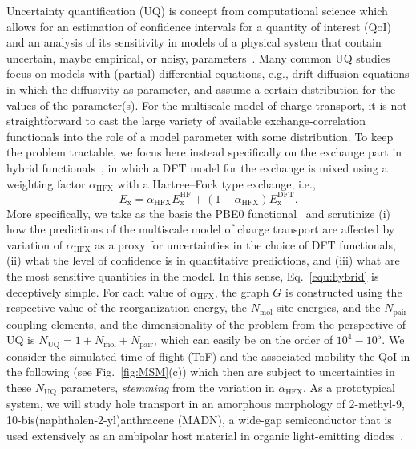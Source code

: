 \documentclass[%
 reprint,
superscriptaddress,
 amsmath,amssymb,
 aps,
prb,
floatfix
]{revtex4-2}
\begin{document}
Uncertainty quantification (UQ) is concept from computational science which allows for an estimation of confidence intervals for a quantity of interest (QoI) and an analysis of its sensitivity in models of a physical system that contain uncertain, maybe empirical, or noisy, parameters~\cite{sarkar_uncertainty_2017,oconnor_quantifying_2024, chernatynskiy_uncertainty_2013, suleimenova_tutorial_2021,coveney_reliability_2021, coveney_when_2021}. Many common UQ studies focus on models with (partial) differential equations, e.g., drift-diffusion equations in which the diffusivity as parameter, and assume a certain distribution for the values of the parameter(s). For the multiscale model of charge transport, it is not straightforward to cast the large variety of available exchange-correlation functionals into the role of a model parameter with some distribution. To keep the problem tractable, we focus here instead specifically on the exchange part in hybrid functionals~\cite{perdew_rationale_1996,marques_densitybased_2011}, in which a DFT model for the exchange is mixed using a weighting factor $\alpha_\text{HFX}$ with a Hartree--Fock type exchange, i.e.,
%
\begin{equation}
  E_\text{x} = \alpha_\text{HFX} E_\text{x}^\text{HF} + (1-\alpha_\text{HFX})E_\text{x}^\text{DFT}.
  \label{equ:hybrid}
\end{equation}
%
More specifically, we take as the basis the PBE0 functional~\cite{adamo_toward_1999} and scrutinize (i) how the predictions of the multiscale model of charge transport are affected by variation of $\alpha_\text{HFX}$ as a proxy for uncertainties in the choice of DFT functionals, (ii) what the level of confidence is in quantitative predictions, and (iii) what are the most sensitive quantities in the model. In this sense, Eq.~\ref{equ:hybrid} is deceptively simple. For each value of $\alpha_\text{HFX}$, the graph $G$ is constructed using the respective value of the reorganization energy, the $N_\text{mol}$ site energies, and the $N_\text{pair}$ coupling elements, and the dimensionality of the problem from the perspective of UQ is $N_\text{UQ}=1+N_\text{mol}+N_\text{pair}$, which can easily be on the order of $10^{4}-10^{5}$. We consider the simulated time-of-flight (ToF) and the associated mobility the QoI in the following (see Fig.~\ref{fig:MSM}(c)) which then are subject to uncertainties in these $N_\text{UQ}$ parameters, {\em stemming} from the variation in $\alpha_\text{HFX}$. As a prototypical system, we will study hole transport in an amorphous morphology of 2-methyl-9, 10-bis(naphthalen-2-yl)anthracene (MADN), a wide-gap semiconductor that is used extensively as an ambipolar host material in organic light-emitting diodes~\cite{ko_accurate_2019, chang_great_2017}. 
\end{document}
